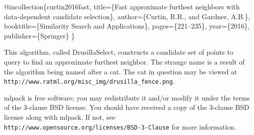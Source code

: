 \begin{DoxyCode}
@incollection\{curtin2016fast,
  title=\{Fast approximate furthest neighbors with data-dependent candidate
         selection\},
  author=\{Curtin, R.R., and Gardner, A.B.\},
  booktitle=\{Similarity Search and Applications\},
  pages=\{221--235\},
  year=\{2016\},
  publisher=\{Springer\}
\}
\end{DoxyCode}


This algorithm, called Drusilla\+Select, constructs a candidate set of points to query to find an approximate furthest neighbor. The strange name is a result of the algorithm being named after a cat. The cat in question may be viewed at {\tt http\+://www.\+ratml.\+org/misc\+\_\+img/drusilla\+\_\+fence.\+png}.

mlpack is free software; you may redistribute it and/or modify it under the terms of the 3-\/clause B\+SD license. You should have received a copy of the 3-\/clause B\+SD license along with mlpack. If not, see {\tt http\+://www.\+opensource.\+org/licenses/\+B\+S\+D-\/3-\/\+Clause} for more information. 